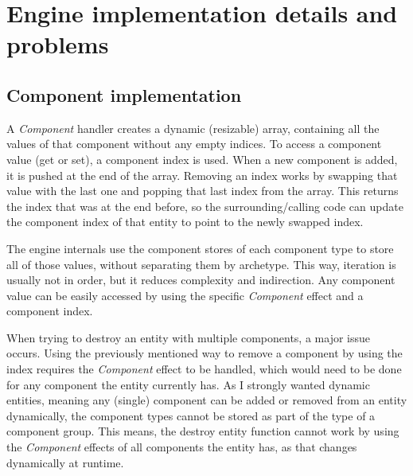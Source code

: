 \chapter{Engine implementation details and problems}\label{chap:details}

\section{Component implementation}

A \textit{Component} handler creates a dynamic (resizable) array, containing all the values of that component without any empty indices. To access a component value (get or set), a component index is used. When a new component is added, it is pushed at the end of the array. Removing an index works by swapping that value with the last one and popping that last index from the array. This returns the index that was at the end before, so the surrounding/calling code can update the component index of that entity to point to the newly swapped index.

The engine internals use the component stores of each component type to store all of those values, without separating them by archetype. This way, iteration is usually not in order, but it reduces complexity and indirection. Any component value can be easily accessed by using the specific \textit{Component} effect and a component index.

When trying to destroy an entity with multiple components, a major issue occurs. Using the previously mentioned way to remove a component by using the index requires the \textit{Component} effect to be handled, which would need to be done for any component the entity currently has. As I strongly wanted dynamic entities, meaning any (single) component can be added or removed from an entity dynamically, the component types cannot be stored as part of the type of a component group. This means, the destroy entity function cannot work by using the \textit{Component} effects of all components the entity has, as that changes dynamically at runtime.

